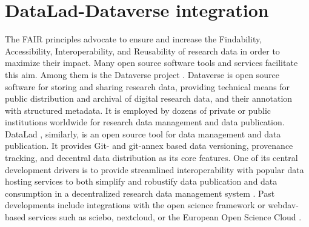 \documentclass[../main.tex]{subfiles}
\begin{document}
\section{DataLad-Dataverse integration}



The FAIR principles \parencite{Wilkinson2016} advocate to ensure and increase the Findability, Accessibility, Interoperability, and Reusability of research data in order to maximize their impact. Many open source software tools and services facilitate this aim. Among them is the Dataverse project \parencite{King2007}. Dataverse is open source software for storing and sharing research data, providing technical means for public distribution and archival of digital research data, and their annotation with structured metadata. It is employed by dozens of private or public institutions worldwide for research data management and data publication. DataLad \parencite{Halchenko2021}, similarly, is an open source tool for data management and data publication. It provides Git- and git-annex based data versioning, provenance tracking, and decentral data distribution as its core features. One of its central development drivers is to provide streamlined interoperability with popular data hosting services to both simplify and robustify data publication and data consumption in a decentralized research data management system \parencite{Hanke2021}. Past developments include integrations with the open science framework \parencite{Hanke2020} or webdav-based services such as sciebo, nextcloud, or the European Open Science Cloud \parencite{Halchenko2022}.
\end{document}
